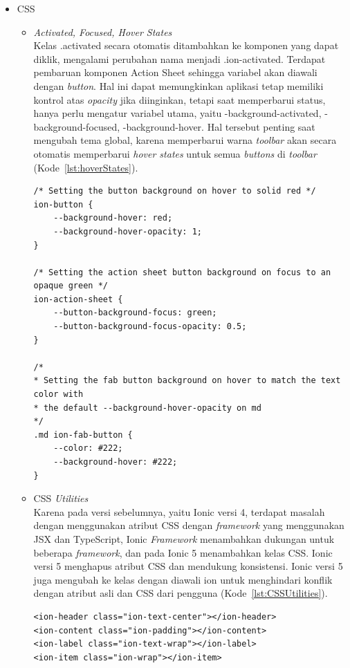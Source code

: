 \begin{enumerate}
	\begin{itemize}
		\item CSS
		\begin{itemize}
			\item {\it Activated, Focused, Hover States} \\
			Kelas .activated secara otomatis ditambahkan ke komponen yang dapat diklik, mengalami perubahan nama menjadi .ion-activated. Terdapat pembaruan komponen Action Sheet sehingga variabel akan diawali dengan {\it button}. Hal ini dapat memungkinkan aplikasi tetap memiliki kontrol atas {\it opacity} jika diinginkan, tetapi saat memperbarui status, hanya perlu mengatur variabel utama, yaitu -background-activated, -background-focused, -background-hover. Hal tersebut penting saat mengubah tema global, karena memperbarui warna {\it toolbar} akan secara otomatis memperbarui {\it hover states} untuk semua {\it buttons} di {\it toolbar} (Kode~\ref{lst:hoverStates}). 		
			
\begin{lstlisting}[label={lst:hoverStates}, caption=Contoh Kode {\it Hover States} pada Ionic 5]
/* Setting the button background on hover to solid red */
ion-button {
	--background-hover: red;
	--background-hover-opacity: 1;
}

/* Setting the action sheet button background on focus to an opaque green */
ion-action-sheet {
	--button-background-focus: green;
	--button-background-focus-opacity: 0.5;
}

/*
* Setting the fab button background on hover to match the text color with
* the default --background-hover-opacity on md
*/
.md ion-fab-button {
	--color: #222;
	--background-hover: #222;
}
\end{lstlisting} 

			\item CSS {\it Utilities} \\
			Karena pada versi sebelumnya, yaitu Ionic versi 4, terdapat masalah dengan menggunakan atribut CSS dengan {\it framework} yang menggunakan JSX dan TypeScript, Ionic {\it Framework} menambahkan dukungan untuk beberapa {\it framework}, dan pada Ionic 5 menambahkan kelas CSS. Ionic versi 5 menghapus atribut CSS dan mendukung konsistensi. Ionic versi 5 juga mengubah ke kelas dengan diawali ion untuk menghindari konflik dengan atribut asli dan CSS dari pengguna (Kode~\ref{lst:CSSUtilities}).		
			
\begin{lstlisting}[label={lst:CSSUtilities}, caption=Contoh Kode Kelas CSS {\it Utility} pada Ionic 5]
<ion-header class="ion-text-center"></ion-header>
<ion-content class="ion-padding"></ion-content>
<ion-label class="ion-text-wrap"></ion-label>
<ion-item class="ion-wrap"></ion-item>
\end{lstlisting} 


\end{itemize}
\end{itemize}
\end{enumerate}
